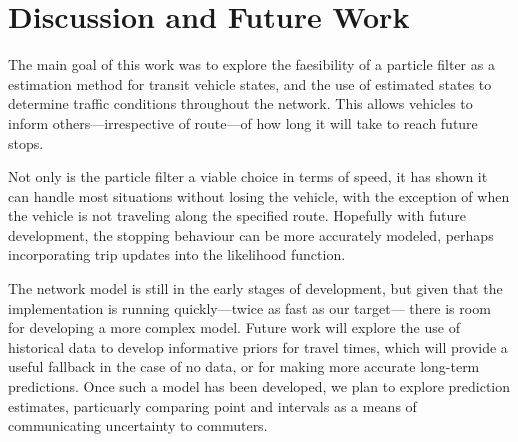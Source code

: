 \section{Discussion and Future Work}
\label{sec:discussion}

The main goal of this work was to explore the faesibility
of a particle filter as a \rt estimation method for transit vehicle states,
and the use of estimated states to determine traffic conditions
throughout the network.
This allows vehicles to inform others---irrespective of route---of 
how long it will take to reach future stops.


Not only is the particle filter a viable choice in terms of speed,
it has shown it can handle most situations without losing the vehicle,
with the exception of when the vehicle is not traveling along
the specified route.
Hopefully with future development,
the stopping behaviour can be more accurately modeled,
perhaps incorporating trip updates into the likelihood function.


The network model is still in the early stages of development,
but given that the implementation is running quickly---twice as fast as our target---%
there is room for developing a more complex model.
Future work will explore the use of historical data to develop informative priors
for travel times,
which will provide a useful fallback in the case of no data,
or for making more accurate long-term predictions.
Once such a model has been developed, we plan to explore prediction estimates,
particuarly comparing point and intervals as a means of communicating 
uncertainty to commuters.
